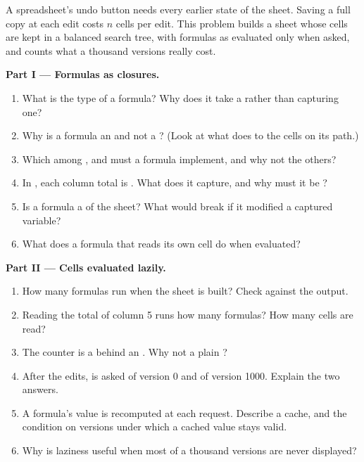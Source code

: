 \begin{problem}\label{pb:b2:functional-programming:1}
A spreadsheet's undo button needs every earlier state of the sheet. Saving a full copy at each edit costs $n$ cells
per edit. This problem builds a sheet whose cells are kept in a  balanced search tree, with formulas as
 evaluated only when asked, and counts what a thousand versions really cost.

\medskip\noindent\textbf{Part I --- Formulas as closures.}\par\nopagebreak
{}
\begin{enumerate}[beginpenalty=10000]
\item What is the type of a formula? Why does it take a  rather than capturing one?
\item Why is a formula an  and not a ? (Look at what  does to the cells
on its path.)
\item Which  among ,  and  must a formula implement, and why not the others?
\item In , each column total is . What
does it capture, and why must it be ?
\item Is a formula a  of the sheet? What would break if it modified a captured variable?
\item What does a formula that reads its own cell do when evaluated?
\end{enumerate}

\medskip\noindent\textbf{Part II --- Cells evaluated lazily.}\par\nopagebreak
{}
\begin{enumerate}[resume, beginpenalty=10000]
\item How many formulas run when the sheet is built? Check against the output.
\item Reading the total of column 5 runs how many formulas? How many cells are read?
\item The counter  is a  behind an . Why not a plain ?
\item After the edits,  is asked of version 0 and of version 1000. Explain the two answers.
\item A formula's value is recomputed at each request. Describe a cache, and the condition on versions under which a
cached value stays valid.
\item Why is laziness useful when most of a thousand versions are never displayed?
\end{enumerate}


\end{problem}
